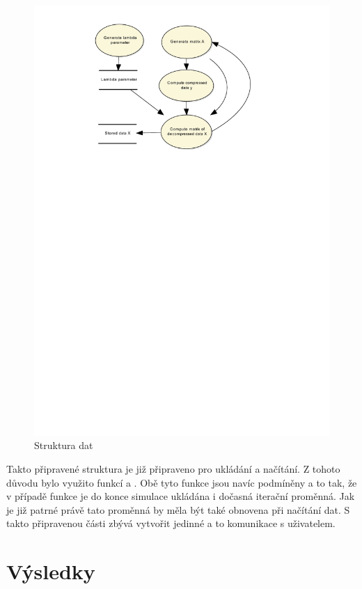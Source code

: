 \documentclass[FM,BP]{tulthesis}
\begin{document}
\begin{figure}[!ht]
	\begin{center}
		\includegraphics[scale=0.4]{obr/mcsim.pdf}
	\end{center}
	\caption{Struktura dat}
	\label{fig:struktura}
\end{figure}

Takto připravené struktura je již připraveno pro ukládání a načítání. Z tohoto důvodu bylo využito funkcí  a . Obě tyto funkce jsou navíc podmíněny a to tak, že v případě funkce  je do konce simulace ukládána i dočasná iterační proměnná. Jak je již patrné právě tato proměnná by měla být také obnovena při načítání dat. S takto připravenou části zbývá vytvořit jedinné a to komunikace s uživatelem. 
\chapter{Výsledky}
\label{ch:vysledky}
\end{document}
